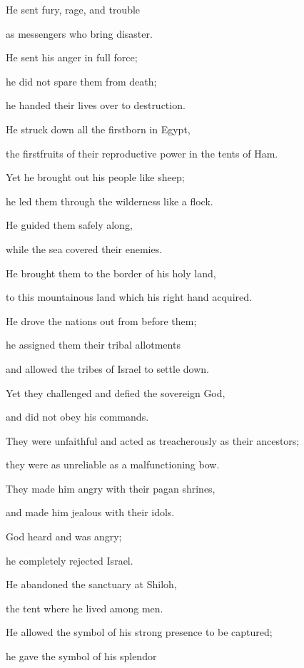 {\par }{\Q He sent
fury,
rage,
and trouble
\par }{\Q as messengers
who bring disaster.
\par }{\Q {}He sent
his anger
in full force;
\par }{\Q he did not
spare
them from death;
\par }{\Q he handed
their lives
over
to destruction.
\par }{\Q {}He struck
down all
the firstborn
in Egypt,
\par }{\Q the firstfruits
of their reproductive power
in the tents
of Ham.
\par }{\Q {}Yet
he brought out his people
like sheep;
\par }{\Q he led
them through the wilderness
like a flock.
\par }{\Q {}He guided
them safely
along,
\par }{\Q while the sea
covered
their enemies.
\par }{\Q {}He brought
them to
the border
of his holy land,
\par }{\Q to this
mountainous land
which his right hand
acquired.
\par }{\Q {}He drove
the nations
out from before
them;
\par }{\Q he assigned
them their tribal
allotments
\par }{\Q and allowed the tribes
of Israel
to settle down.
\par }{\Q {}Yet they challenged
and defied
the sovereign
God,
\par }{\Q and did not
obey his commands.
\par }{\Q {}They were unfaithful
and acted
as treacherously
as their ancestors;
\par }{\Q they were as unreliable
as a malfunctioning
bow.
\par }{\Q {}They made him angry
with their pagan shrines,
\par }{\Q and made him jealous
with their idols.
\par }{\Q {}God
heard
and was angry;
\par }{\Q he completely
rejected
Israel.
\par }{\Q {}He abandoned
the sanctuary
at Shiloh,
\par }{\Q the tent
where
he lived
among men.
\par }{\Q {}He allowed
the symbol of his strong
presence to be captured;
\par }{\Q he gave the symbol of his splendor
}
